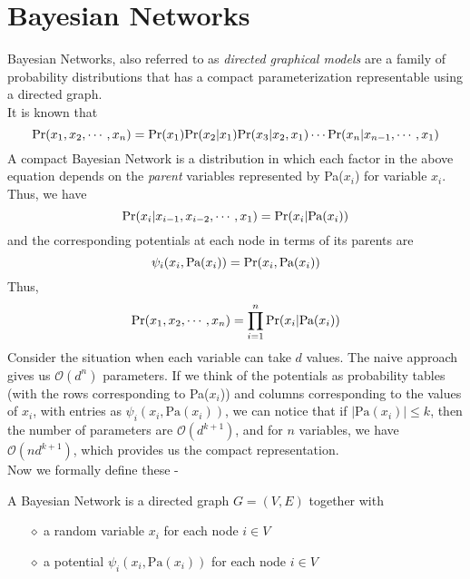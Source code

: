 \section{Bayesian Networks}
Bayesian Networks, also referred to as \textit{directed graphical models} are a family of probability distributions that has a compact parameterization representable using a directed graph. \\
It is known that
\begin{equation}
\text{Pr}(x_1, x_2, \cdots, x_n) = \text{Pr}(x_1)\text{Pr}(x_2|x_1)\text{Pr}(x_3|x_2,x_1)\cdots\text{Pr}(x_n|x_{n-1}, \cdots, x_1)
\end{equation}
A compact Bayesian Network is a distribution in which each factor in the above equation depends on the \textit{parent} variables represented by Pa($x_i$) for variable $x_i$. Thus, we have
\begin{equation}
\text{Pr}(x_i|x_{i-1}, x_{i-2}, \cdots ,x_1) = \text{Pr}(x_i|\text{Pa}(x_i))
\end{equation}
and the corresponding potentials at each node in terms of its parents are
\begin{equation}
\psi_i(x_i, \text{Pa}(x_i)) = \text{Pr}(x_i, \text{Pa}(x_i))
\end{equation}
Thus,
\begin{equation}
	\text{Pr}(x_1, x_2, \cdots, x_n) = \prod_{i=1}^n \text{Pr}(x_i|\text{Pa}(x_i))
\end{equation}
Consider the situation when each variable can take $d$ values. The naive approach gives us $\mathcal{O}(d^n)$ parameters. If we think of the potentials as probability tables (with the rows corresponding to Pa($x_i$)) and columns corresponding to the values of $x_i$, with entries as $\psi_{i}(x_i, \text{Pa}(x_i))$, we can notice that if $|\text{Pa}(x_i)| \leq k$, then the number of parameters are $\mathcal{O}(d^{k+1})$, and for $n$ variables, we have $\mathcal{O}(nd^{k+1})$, which provides us the compact representation. \\
Now we formally define these -
\begin{defn}
A Bayesian Network is a directed graph $G = (V, E)$ together with 
\begin{itemize}
	\item[$\diamond$] a random variable $x_i$ for each node $i \in V$
	\item[$\diamond$] a potential $\psi_i(x_i, \text{Pa}(x_i))$ for each node $i \in V$
\end{itemize}
\end{defn}